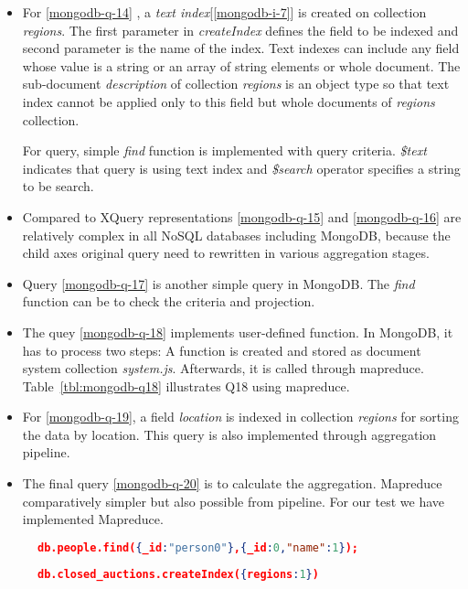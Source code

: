 \begin{itemize}
\item For \ref{mongodb-q-14} , a \textit{text index}[\ref{mongodb-i-7}] is created on collection \textit{regions}. The first parameter in \textit{createIndex} defines the field to be indexed and second parameter is the name of the index. Text indexes can include any field whose value is a string or an array of string elements or whole document. The sub-document \textit{description} of collection \textit{regions} is an object type so that text index cannot be applied only to this field but whole documents of \textit{regions} collection. 
\par
For query, simple \textit{find} function is implemented with query criteria. \textit{\$text} indicates that query is using text index and \textit{\$search} operator specifies a string to be search. 

\item Compared to XQuery representations \ref{mongodb-q-15} and \ref{mongodb-q-16} are relatively complex in all NoSQL databases including MongoDB, because the child axes original query need to rewritten in various aggregation stages.

\item Query \ref{mongodb-q-17} is another simple query in MongoDB. The \textit{find} function can be to check the criteria and projection. 

\item The quey \ref{mongodb-q-18} implements user-defined function. In MongoDB, it has to process two steps: A function is created and stored as document system collection \textit{system.js}. Afterwards, it is called through mapreduce. Table~\ref{tbl:mongodb-q18} illustrates Q18 using mapreduce.

\item For \ref{mongodb-q-19}, a field  \textit{location} is indexed in collection \textit{regions} for sorting the data by location. This query is also implemented through aggregation pipeline. 
\item
The final query \ref{mongodb-q-20} is to calculate the aggregation. Mapreduce comparatively simpler but also possible from pipeline. For our test we have implemented Mapreduce. 
\end{itemize}


\begin{figure}
\centering
\begin{lstlisting}[language=JSON, caption=XMark Query Q1 in MongoDB, label=mongo-xmark-q1]
		db.people.find({_id:"person0"},{_id:0,"name":1});
\end{lstlisting}
\centering
\begin{lstlisting}[language=JSON, caption=MongoDB secondary Index, label=mongodb-create-index]
          db.closed_auctions.createIndex({regions:1})
\end{lstlisting}
\end{figure}


